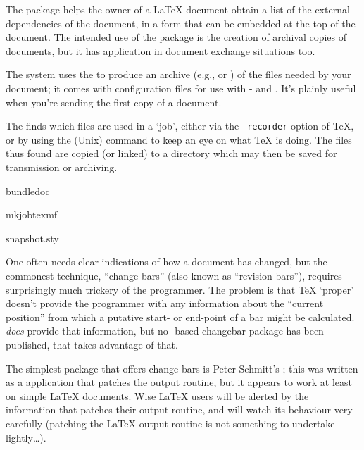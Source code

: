 The  package helps the owner of a \LaTeX{} document
obtain a list of the external dependencies of the document, in a form
that can be embedded at the top of the document.  The intended use of
the package is the creation of archival copies of documents, but it
has application in document exchange situations too.

The  system uses the  to produce an
archive (e.g.,  or ) of the files needed by your
document; it comes with configuration files for use with
\texlive{}- and \ProgName{\miktex{}}.  It's plainly useful when
you're sending the first copy of a document.

The  finds which files are used in a `job',
either via the \texttt{-recorder} option of \TeX{}, or by using the
(Unix) command  to keep an eye on what \TeX{} is
doing.  The files thus found are copied (or linked) to a directory
which may then be saved for transmission or archiving.
\begin{ctanrefs}
\item[bundledoc]
\item[mkjobtexmf]
\item[snapshot.sty]
\end{ctanrefs}


One often needs clear indications of how a document has changed, but
the commonest technique, ``change bars'' (also known as ``revision
bars''), requires surprisingly much
trickery of the programmer.  The problem is that \TeX{} `proper'
doesn't provide the programmer with any information about the
``current position'' from which a putative start- or end-point of a
bar might be calculated.   \PDFTeX{} \emph{does} provide that
information, but no \PDFTeX{}-based changebar package has been
published, that takes advantage of that.

The simplest package that offers change bars is Peter Schmitt's
; this was written as a \plaintex{} application
that patches the output routine, but it appears to work at least on
simple \LaTeX{} documents.  Wise \LaTeX{} users will be alerted by the
information that  patches their output routine, and
will watch its behaviour very carefully (patching the \LaTeX{} output
routine is not something to undertake lightly\dots{}).


